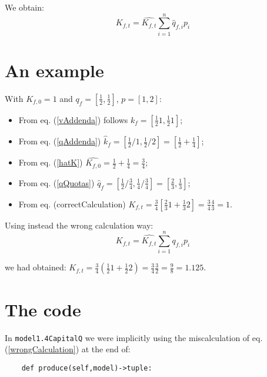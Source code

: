 \documentclass[]{amsart} %
\begin{document}
We obtain:
\begin{equation}
K_{f,t}= \hat{K_{f,t}} \sum_{i=1}^{n}  \hat{q}_{f,i} p_i
\label{correctCalculation}
\end{equation} 

\section{An example}

With $K_{f,0}=1$ and $q_f=[\frac{1}{2},\frac{1}{2}]$,  $p=[1,2]$:

\begin{itemize}
\item From eq. (\ref{vAddenda}) follows $k_f = [\frac{1}{2} 1, \frac{1}{2} 1]$;

\item From eq. (\ref{qAddenda}) $\hat{k}_f = [\frac{1}{2}/1, \frac{1}{2}/2  ] = [\frac{1}{2} + \frac{1}{4}]$;

\item From eq. (\ref{hatK}) $\hat{K_{f,0}} = \frac{1}{2} + \frac{1}{4} = \frac{3}{4}$;

\item From eq. (\ref{qQuotas}) $\hat{q}_f = [\frac{1}{2}  / \frac{3}{4}, \frac{1}{4} / \frac{3}{4}] = [\frac{2}{3}, \frac{1}{3}]$;

\item From eq. ({correctCalculation}) $K_{f,t}= \frac{3}{4} [\frac{2}{3} 1 + \frac{1}{3} 2] = \frac{3}{4} \frac{4}{3} = 1$.

\end{itemize}

Using instead the wrong calculation way:
\begin{equation}
K_{f,t}= \hat{K_{f,t}} \sum_{i=1}^{n}  q_{f,i} p_i
\label{wrongCalculation}
\end{equation} 

we had obtained:
$K_{f,t}=  \frac{3}{4} (\frac{1}{2} 1 + \frac{1}{2} 2)=\frac{3}{4} \frac{3}{2} = \frac{9}{8} = 1.125$.

\section{The code}

In \verb|model1.4CapitalQ| we were implicitly using the miscalculation of eq. (\ref{wrongCalculation}) at the end of:

\scriptsize
\begin{verbatim}
    def produce(self,model)->tuple: 
\end{verbatim}
\normalsize
\end{document}
